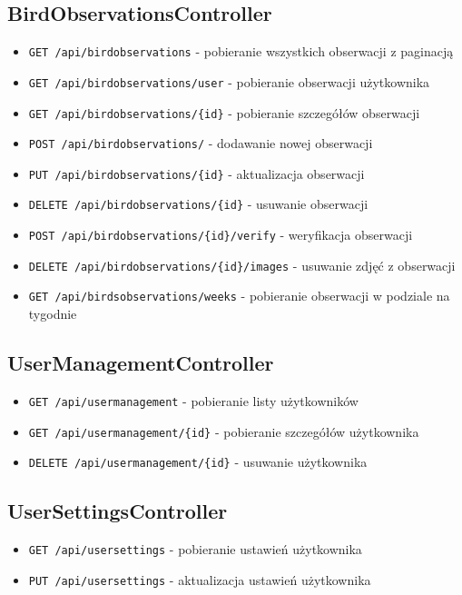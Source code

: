 \subsection{BirdObservationsController}
\begin{itemize}
	\item \texttt{GET /api/birdobservations} - pobieranie wszystkich obserwacji z paginacją
	\item \texttt{GET /api/birdobservations/user} - pobieranie obserwacji użytkownika
	\item \texttt{GET /api/birdobservations/\{id\}} - pobieranie szczegółów obserwacji
	\item \texttt{POST /api/birdobservations/} - dodawanie nowej obserwacji
	\item \texttt{PUT /api/birdobservations/\{id\}} - aktualizacja obserwacji
	\item \texttt{DELETE /api/birdobservations/\{id\}} - usuwanie obserwacji
	\item \texttt{POST /api/birdobservations/\{id\}/verify} - weryfikacja obserwacji
	\item \texttt{DELETE /api/birdobservations/\{id\}/images} - usuwanie zdjęć z obserwacji
	\item \texttt{GET /api/birdsobservations/weeks} - pobieranie obserwacji w podziale na tygodnie
\end{itemize}

\subsection{UserManagementController}
\begin{itemize}
	\item \texttt{GET /api/usermanagement} - pobieranie listy użytkowników
	\item \texttt{GET /api/usermanagement/\{id\}} - pobieranie szczegółów użytkownika
	\item \texttt{DELETE /api/usermanagement/\{id\}} - usuwanie użytkownika 
\end{itemize}

\subsection{UserSettingsController}
\begin{itemize}
	\item \texttt{GET /api/usersettings} - pobieranie ustawień użytkownika
	\item \texttt{PUT /api/usersettings} - aktualizacja ustawień użytkownika
\end{itemize}